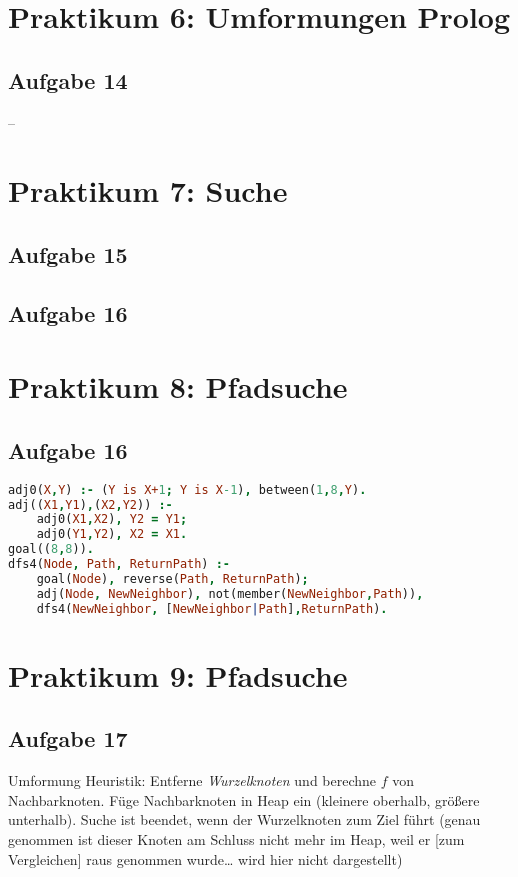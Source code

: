 \documentclass{scrreprt}
\begin{document}
\chapter{Praktikum 6: Umformungen Prolog}
\section{Aufgabe 14}
--

\chapter{Praktikum 7: Suche}
\section{Aufgabe 15}


\section{Aufgabe 16}


\chapter{Praktikum 8: Pfadsuche}
\section{Aufgabe 16}
\begin{lstlisting}[language=Prolog]
adj0(X,Y) :- (Y is X+1; Y is X-1), between(1,8,Y).
adj((X1,Y1),(X2,Y2)) :-
	adj0(X1,X2), Y2 = Y1;
	adj0(Y1,Y2), X2 = X1.
goal((8,8)).
dfs4(Node, Path, ReturnPath) :-
	goal(Node), reverse(Path, ReturnPath);
	adj(Node, NewNeighbor), not(member(NewNeighbor,Path)),
	dfs4(NewNeighbor, [NewNeighbor|Path],ReturnPath).
\end{lstlisting}


\chapter{Praktikum 9: Pfadsuche}
\section{Aufgabe 17}
Umformung Heuristik: Entferne \emph{Wurzelknoten} und berechne $f$ von Nachbarknoten. Füge Nachbarknoten in Heap ein (kleinere oberhalb, größere unterhalb). Suche ist beendet, wenn der Wurzelknoten zum Ziel führt (genau genommen ist dieser Knoten am Schluss nicht mehr im Heap, weil er [zum Vergleichen] raus genommen wurde… wird hier nicht dargestellt)
\end{document}
